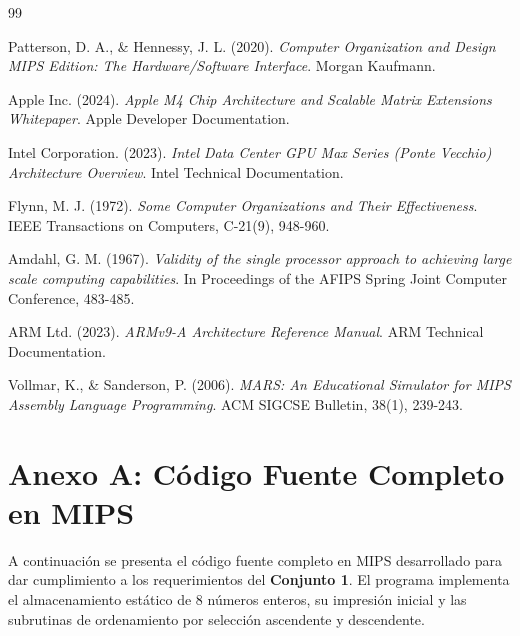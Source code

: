 \documentclass[12pt,a4paper]{article}
\begin{document}
\newpage
\appendix

\begin{thebibliography}{99}

Patterson, D. A., \& Hennessy, J. L. (2020). \textit{Computer Organization and Design MIPS Edition: The Hardware/Software Interface}. Morgan Kaufmann.

Apple Inc. (2024). \textit{Apple M4 Chip Architecture and Scalable Matrix Extensions Whitepaper}. Apple Developer Documentation.

Intel Corporation. (2023). \textit{Intel Data Center GPU Max Series (Ponte Vecchio) Architecture Overview}. Intel Technical Documentation.

Flynn, M. J. (1972). \textit{Some Computer Organizations and Their Effectiveness}. IEEE Transactions on Computers, C-21(9), 948-960.

Amdahl, G. M. (1967). \textit{Validity of the single processor approach to achieving large scale computing capabilities}. In Proceedings of the AFIPS Spring Joint Computer Conference, 483-485.

ARM Ltd. (2023). \textit{ARMv9-A Architecture Reference Manual}. ARM Technical Documentation.

Vollmar, K., \& Sanderson, P. (2006). \textit{MARS: An Educational Simulator for MIPS Assembly Language Programming}. ACM SIGCSE Bulletin, 38(1), 239-243.

\end{thebibliography}

\newpage
\appendix
\section{Anexo A: Código Fuente Completo en MIPS}
\label{sec:anexo_mips}

A continuación se presenta el código fuente completo en MIPS desarrollado para dar cumplimiento a los requerimientos del \textbf{Conjunto 1}. El programa implementa el almacenamiento estático de 8 números enteros, su impresión inicial y las subrutinas de ordenamiento por selección ascendente y descendente.
\end{document}
